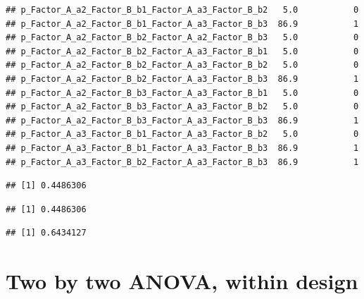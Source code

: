 \documentclass[]{book}
\newenvironment{Shaded}{\begin{snugshade}}{\end{snugshade}}
\newcommand{\CommentTok}[1]{\textcolor[rgb]{0.56,0.35,0.01}{\textit{#1}}}
\newcommand{\KeywordTok}[1]{\textcolor[rgb]{0.13,0.29,0.53}{\textbf{#1}}}
\newcommand{\NormalTok}[1]{#1}
\newcommand{\OperatorTok}[1]{\textcolor[rgb]{0.81,0.36,0.00}{\textbf{#1}}}
\newcommand{\StringTok}[1]{\textcolor[rgb]{0.31,0.60,0.02}{#1}}
\begin{document}
\begin{verbatim}
## p_Factor_A_a2_Factor_B_b1_Factor_A_a3_Factor_B_b2   5.0           0
## p_Factor_A_a2_Factor_B_b1_Factor_A_a3_Factor_B_b3  86.9           1
## p_Factor_A_a2_Factor_B_b2_Factor_A_a2_Factor_B_b3   5.0           0
## p_Factor_A_a2_Factor_B_b2_Factor_A_a3_Factor_B_b1   5.0           0
## p_Factor_A_a2_Factor_B_b2_Factor_A_a3_Factor_B_b2   5.0           0
## p_Factor_A_a2_Factor_B_b2_Factor_A_a3_Factor_B_b3  86.9           1
## p_Factor_A_a2_Factor_B_b3_Factor_A_a3_Factor_B_b1   5.0           0
## p_Factor_A_a2_Factor_B_b3_Factor_A_a3_Factor_B_b2   5.0           0
## p_Factor_A_a2_Factor_B_b3_Factor_A_a3_Factor_B_b3  86.9           1
## p_Factor_A_a3_Factor_B_b1_Factor_A_a3_Factor_B_b2   5.0           0
## p_Factor_A_a3_Factor_B_b1_Factor_A_a3_Factor_B_b3  86.9           1
## p_Factor_A_a3_Factor_B_b2_Factor_A_a3_Factor_B_b3  86.9           1
\end{verbatim}

\begin{Shaded}
\end{Shaded}

\begin{verbatim}
## [1] 0.4486306
\end{verbatim}

\begin{Shaded}
\end{Shaded}

\begin{verbatim}
## [1] 0.4486306
\end{verbatim}

\begin{Shaded}
\end{Shaded}

\begin{verbatim}
## [1] 0.6434127
\end{verbatim}

\hypertarget{two-by-two-anova-within-design}{%
\section{Two by two ANOVA, within design}\label{two-by-two-anova-within-design}}
\end{document}
